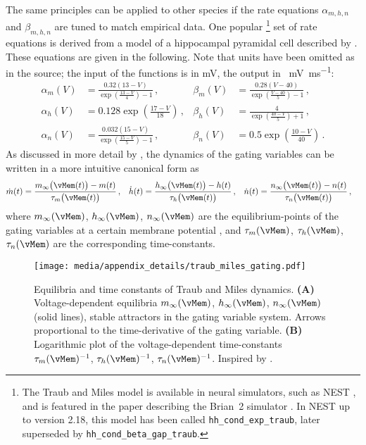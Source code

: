 The same principles can be applied to other species if the rate equations $\alpha_{m, h, n}$ and $\beta_{m, h, n}$ are tuned to match empirical data.
One popular%
\footnote{The Traub and Miles model is available in neural simulators, such as NEST \citep{gewaltig2007nest}, and is featured in the paper describing the Brian~2 simulator \citep{stimberg2019brian}. In NEST up to version 2.18, this model has been called \texttt{hh\_cond\_exp\_traub}, later superseded by \texttt{hh\_cond\_beta\_gap\_traub}.}
set of rate equations is derived from a model of a hippocampal pyramidal cell described by \citet[Chapter 4, p.~92-94]{traub1991neuronal}.
These equations are given in the following.
Note that units have been omitted as in the source; the input of the functions is in \si{\milli\volt}, the output in \si{\per\milli\volt\per\milli\second}:
\begin{align*}
	\alpha_m(V) &= \frac{0.32(13 - V)}{\exp\left(\frac{13 - V}{4}\right) - 1} \,, &
	\beta_m(V) &= \frac{0.28(V - 40)}{\exp\left(\frac{V - 40}{5}\right) - 1} \,, \\
	\alpha_h(V) &= 0.128 \exp\left( \frac{17 - V}{18}\right) \,, &
	\beta_h(V) &= \frac{4}{ \exp\left( \frac{40 - V}{5}\right) + 1 } \,, \\
	\alpha_n(V) &= \frac{0.032(15 - V)}{\exp\left(\frac{15 - V}{5}\right) - 1} \,, &
	\beta_n(V) &= 0.5 \exp\left(\frac{10 - V}{40}\right) \,.
\end{align*}
As discussed in more detail by \citet[Chapter~2.3]{izhikevich2007dynamical}, the dynamics of the gating variables can be written in a more intuitive canonical form as
\begin{align*}
	\dot m(t) &= \frac{m_\infty\bigl(\vMem(t)\bigr) - m(t)}{\tau_m\bigl(\vMem(t)\bigr)} \,, &
	\dot h(t) &= \frac{h_\infty\bigl(\vMem(t)\bigr) - h(t)}{\tau_h\bigl(\vMem(t)\bigr)} \,, &
	\dot n(t) &= \frac{n_\infty\bigl(\vMem(t)\bigr) - n(t)}{\tau_n\bigl(\vMem(t)\bigr)} \,,
\end{align*}
where $m_\infty(\vMem)$, $h_\infty(\vMem)$, $n_\infty(\vMem)$ are the equilibrium-points of the gating variables at a certain membrane potential \vMem, and $\tau_m(\vMem)$, $\tau_h(\vMem)$, $\tau_n(\vMem)$ are the corresponding time-constants.

\begin{figure}[t]
	\centering
	\texttt{[image: media/appendix\_details/traub\_miles\_gating.pdf]}%
	{\label{fig:traub_miles_gating_equilibrium}}%
	{\label{fig:traub_miles_gating_time_constants}}%
	\caption[Equilibria and time constants of the Traub and Miles dynamics]{Equilibria and time constants of Traub and Miles dynamics. \textbf{(A)} Voltage-dependent equilibria $m_\infty(\vMem)$, $h_\infty(\vMem)$, $n_\infty(\vMem)$ (solid lines), stable attractors in the gating variable system.
	Arrows proportional to the time-derivative of the gating variable. \textbf{(B)} Logarithmic plot of the voltage-dependent time-constants $\tau_m(\vMem)^{-1}$, $\tau_h(\vMem)^{-1}$, $\tau_n(\vMem)^{-1}$. Inspired by \citet[Figure~2.13, p.~39]{izhikevich2007dynamical}.	}
	\label{fig:traub_miles}
\end{figure} 

